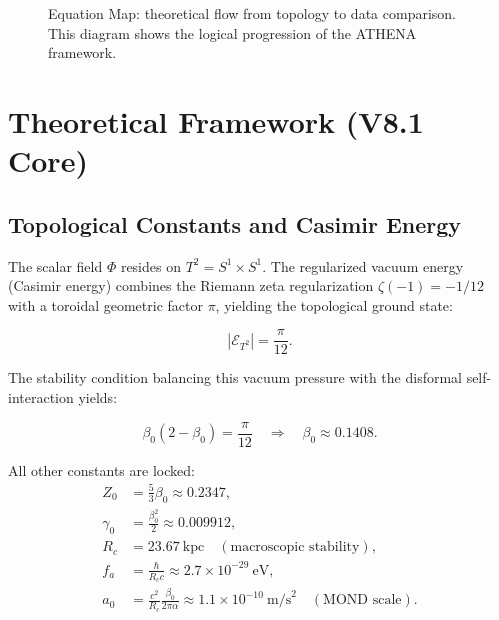 \documentclass[12pt,a4paper]{article}
\numberwithin{equation}{section}
\begin{document}
\begin{figure}[h]
\centering
{}
\caption{Equation Map: theoretical flow from topology to data comparison. This diagram shows the logical progression of the ATHENA framework.}
\label{fig:eqmap}
\end{figure}

\section{Theoretical Framework (V8.1 Core)}

\subsection{Topological Constants and Casimir Energy}

The scalar field $\Phi$ resides on $T^2 = S^1 \times S^1$. The regularized vacuum energy (Casimir energy) combines the Riemann zeta regularization $\zeta(-1) = -1/12$ with a toroidal geometric factor $\pi$, yielding the topological ground state:

\begin{equation}
|\mathcal{E}_{T^2}| = \frac{\pi}{12}.
\end{equation}

The stability condition balancing this vacuum pressure with the disformal self-interaction yields:

\begin{equation}
\beta_0(2 - \beta_0) = \frac{\pi}{12} \quad \Rightarrow \quad \beta_0 \approx 0.1408.
\end{equation}

All other constants are locked:
\begin{align}
Z_0 &= \frac{5}{3}\beta_0 \approx 0.2347, \\
\gamma_0 &= \frac{\beta_0^2}{2} \approx 0.009912, \\
R_c &= 23.67\ \text{kpc} \quad (\text{macroscopic stability}), \\
f_a &= \frac{\hbar}{R_c c} \approx 2.7\times10^{-29}\ \text{eV}, \\
a_0 &= \frac{c^2}{R_c}\frac{\beta_0}{2\pi\alpha} \approx 1.1\times10^{-10}\ \text{m/s}^2 \quad (\text{MOND scale}).
\end{align}
\end{document}
